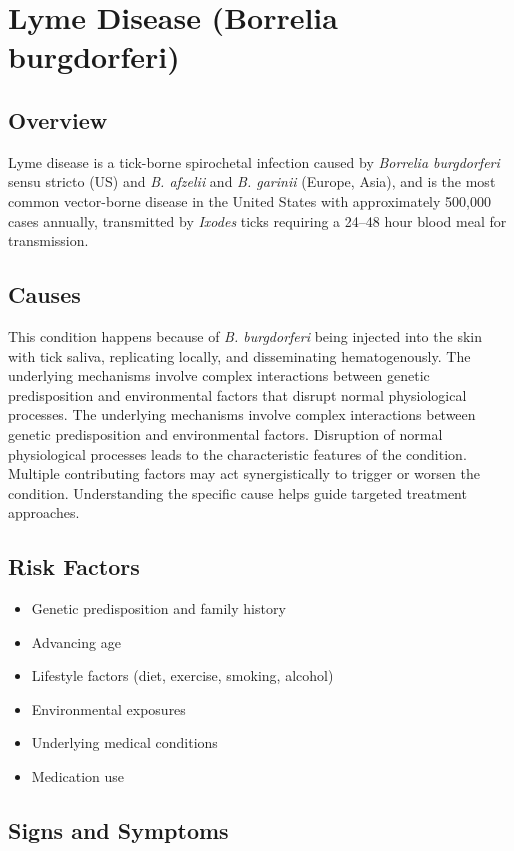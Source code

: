 \chapter{Lyme Disease (Borrelia burgdorferi)}
\label{sec:Lyme Disease}

\section{Overview}
Lyme disease is a tick-borne spirochetal infection caused by \textit{Borrelia burgdorferi} sensu stricto (US) and \textit{B. afzelii} and \textit{B. garinii} (Europe, Asia), and is the most common vector-borne disease in the United States with approximately 500,000 cases annually, transmitted by \textit{Ixodes} ticks requiring a 24--48 hour blood meal for transmission.
\section{Causes}
This condition happens because of \textit{B. burgdorferi} being injected into the skin with tick saliva, replicating locally, and disseminating hematogenously. The underlying mechanisms involve complex interactions between genetic predisposition and environmental factors that disrupt normal physiological processes. The underlying mechanisms involve complex interactions between genetic predisposition and environmental factors. Disruption of normal physiological processes leads to the characteristic features of the condition. Multiple contributing factors may act synergistically to trigger or worsen the condition. Understanding the specific cause helps guide targeted treatment approaches.
\section{Risk Factors}


\begin{itemize}[noitemsep]
  \item Genetic predisposition and family history
  \item Advancing age
  \item Lifestyle factors (diet, exercise, smoking, alcohol)
  \item Environmental exposures
  \item Underlying medical conditions
  \item Medication use
\end{itemize}
\section{Signs and Symptoms}


